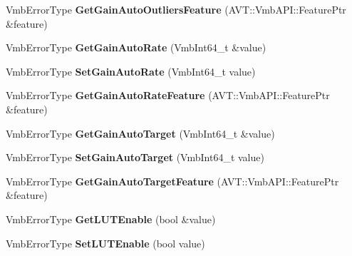 \begin{DoxyCompactItemize}
\item 
\hypertarget{classMakoCamera_a9cd1bd9aa0896ee340d17f20c0f3e545}{Vmb\-Error\-Type {\bfseries Get\-Gain\-Auto\-Outliers\-Feature} (A\-V\-T\-::\-Vmb\-A\-P\-I\-::\-Feature\-Ptr \&feature)}\label{classMakoCamera_a9cd1bd9aa0896ee340d17f20c0f3e545}

\item 
\hypertarget{classMakoCamera_ac8a0b6afed75deb41a9d9fb0eaeac415}{Vmb\-Error\-Type {\bfseries Get\-Gain\-Auto\-Rate} (Vmb\-Int64\-\_\-t \&value)}\label{classMakoCamera_ac8a0b6afed75deb41a9d9fb0eaeac415}

\item 
\hypertarget{classMakoCamera_a06564c8a747b4d59cac3192f4ec16bec}{Vmb\-Error\-Type {\bfseries Set\-Gain\-Auto\-Rate} (Vmb\-Int64\-\_\-t value)}\label{classMakoCamera_a06564c8a747b4d59cac3192f4ec16bec}

\item 
\hypertarget{classMakoCamera_aac5b0e7bed6098320a380428b35a9c41}{Vmb\-Error\-Type {\bfseries Get\-Gain\-Auto\-Rate\-Feature} (A\-V\-T\-::\-Vmb\-A\-P\-I\-::\-Feature\-Ptr \&feature)}\label{classMakoCamera_aac5b0e7bed6098320a380428b35a9c41}

\item 
\hypertarget{classMakoCamera_adf1ebe7270533798052bf1f35817ef8d}{Vmb\-Error\-Type {\bfseries Get\-Gain\-Auto\-Target} (Vmb\-Int64\-\_\-t \&value)}\label{classMakoCamera_adf1ebe7270533798052bf1f35817ef8d}

\item 
\hypertarget{classMakoCamera_a48ff7e8dc36e71a21d3ee6db3cc3e601}{Vmb\-Error\-Type {\bfseries Set\-Gain\-Auto\-Target} (Vmb\-Int64\-\_\-t value)}\label{classMakoCamera_a48ff7e8dc36e71a21d3ee6db3cc3e601}

\item 
\hypertarget{classMakoCamera_a760fc9a1df53c5048c807a566a5809ef}{Vmb\-Error\-Type {\bfseries Get\-Gain\-Auto\-Target\-Feature} (A\-V\-T\-::\-Vmb\-A\-P\-I\-::\-Feature\-Ptr \&feature)}\label{classMakoCamera_a760fc9a1df53c5048c807a566a5809ef}

\item 
\hypertarget{classMakoCamera_addb6d75a9cce5d1fe06b0aafa1caad57}{Vmb\-Error\-Type {\bfseries Get\-L\-U\-T\-Enable} (bool \&value)}\label{classMakoCamera_addb6d75a9cce5d1fe06b0aafa1caad57}

\item 
\hypertarget{classMakoCamera_a49232a5592c201bd88c3bdce538ef21f}{Vmb\-Error\-Type {\bfseries Set\-L\-U\-T\-Enable} (bool value)}\label{classMakoCamera_a49232a5592c201bd88c3bdce538ef21f}


\end{DoxyCompactItemize}
